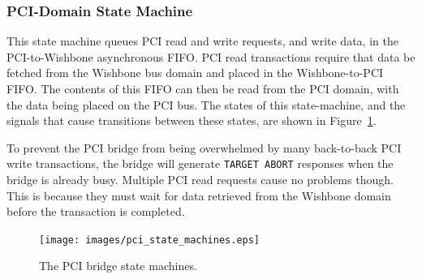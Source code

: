 \subsubsection{PCI-Domain State Machine}
This state machine queues PCI read and write requests, and write data, in the
PCI-to-Wishbone asynchronous FIFO. PCI read transactions require that data be
fetched from the Wishbone bus domain and placed in the Wishbone-to-PCI FIFO. The
contents of this FIFO can then be read from the PCI domain, with the data being
placed on the PCI bus. The states of this state-machine, and the signals that
cause transitions between these states, are shown in Figure~\ref{PCI_SMs}.

To prevent the PCI bridge from being overwhelmed by many back-to-back PCI write
transactions, the bridge will generate \texttt{TARGET ABORT} responses when the
bridge is already busy. Multiple PCI read requests cause no problems though. This
is because they must wait for data retrieved from the Wishbone domain before
the transaction is completed.

\begin{figure}[h!]
\begin{center}
\texttt{[image: images/pci\_state\_machines.eps]}
\end{center}
\caption[The PCI bridge state machines]{The PCI bridge state machines.}
\label{PCI_SMs}
\end{figure}





